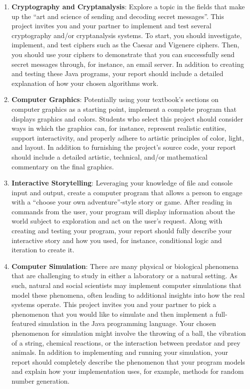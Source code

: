 \documentclass[11pt]{article}
\begin{document}
\begin{enumerate}

  \item {\bf Cryptography and Cryptanalysis}: Explore a topic in the fields that make up the ``art and science of
    sending and decoding secret messages''. This project invites you and your partner to implement and test several
    cryptography and/or cryptanalysis systems. To start, you should investigate, implement, and test ciphers such as
    the Caesar and Vigenere ciphers. Then, you should use your ciphers to demonstrate that you can successfully send
    secret messages through, for instance, an email server. In addition to creating and testing these Java programs,
    your report should include a detailed explanation of how your chosen algorithms work.

  \item {\bf Computer Graphics}: Potentially using your textbook's sections on computer graphics as a starting point,
    implement a complete program that displays graphics and colors. Students who select this project should consider
    ways in which the graphics can, for instance, represent realistic entities, support interactivity, and properly
    adhere to artistic principles of color, light, and layout. In addition to furnishing the project's source code, your
    report should include a detailed artistic, technical, and/or mathematical commentary on the final graphics.

  \item {\bf Interactive Storytelling}: Leveraging your knowledge of file and console input and output, create a
    computer program that allows a person to engage with a ``choose your own adventure''-style story or game. After
    reading in commands from the user, your program will display information about the world subject to exploration and
    act on the user's request. Along with creating and testing your program, your report should fully describe your
    interactive story and how you used, for instance, conditional logic and iteration to create it.

  \item {\bf Computer Simulation}: There are many physical or biological phenomena that are challenging to study in
    either a laboratory or a natural setting. As such, natural and social scientists may implement computer simulations
    that model these phenomena, often leading to additional insights into how the real systems operate. This project
    invites you and your partner to pick a phenomenon that you would like to simulate and then implement a full-featured
    simulation in the Java programming language. Your chosen phenomenon for simulation might involve the throwing of a
    ball, the vibration of a string, chemical reactions, or the interaction between predator and prey animals. In
    addition to implementing and running your simulation, your report should completely describe the phenomenon that
    your program models and explain how your implementation uses, for example, methods for random number generation.


\end{enumerate}
\end{document}
